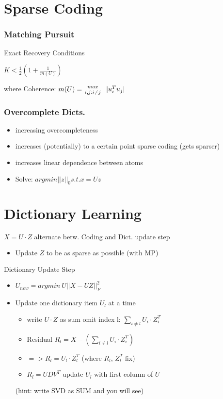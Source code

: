 \documentclass[11pt,twocolumn]{article}
\begin{document}
\section{Sparse Coding}
\subsubsection{Matching Pursuit}

Exact Recovery Conditions

$K< \frac{1}{2} \left(1+\frac{1}{m(U)}\right)$

where Coherence:  $m(U)= {max  \atop i,j:i \neq j} ~~ |u_i^T u_j|$

\subsubsection{Overcomplete Dicts.}
\begin{itemize}
\item increasing overcompleteness
\item increases (potentially) to a certain point sparse coding (gets sparser)
\item increases linear dependence between atoms
\item Solve: $arg min ||z||_0 s.t. x = Uz$

\end{itemize}



\section{Dictionary Learning}
$X = U \cdot Z$ alternate betw.
Coding and Dict. update step
\begin{itemize}
\item Update $Z$ to be as sparse as possible (with MP)
\end{itemize}

Dictionary Update Step
\begin{itemize}
\item  $U_{new} =  arg min~ U  ||X-UZ||^2_F$
\item Update one dictionary item $U_l$ at a time
	\begin{itemize}
	

  \item write $U \cdot Z$ as sum omit index l: 
  $\sum_{i \neq l}{U_i \cdot Z^T_i}$
  \item Residual $R_l =  X - \left(\sum_{i \neq l}{U_i \cdot Z^T_i}\right)$
  \item $=> R_l = U_l \cdot Z^T_l$ (where $R_l$, $Z^T_l$ fix)
  \item $R_l = UDV^T$ update $U_l$ with first column of $U$
	\end{itemize}  
   (hint: write SVD as SUM and you will see)

\end{itemize}
\end{document}
